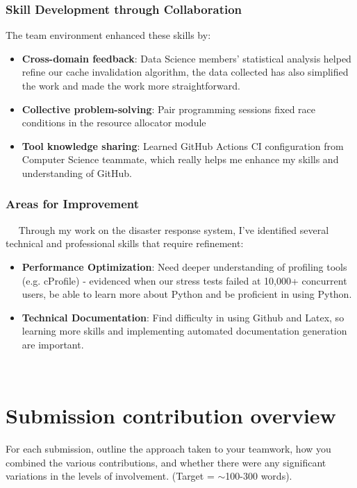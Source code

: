 \documentclass[a4paper, 11pt]{report}
\begin{document}
\subsubsection{Skill Development through Collaboration}
The team environment enhanced these skills by:
\begin{itemize}
    \item \textbf{Cross-domain feedback}: Data Science members' statistical analysis helped refine our cache invalidation algorithm, the data collected has also simplified the work and made the work more straightforward.
    \item \textbf{Collective problem-solving}: Pair programming sessions fixed race conditions in the resource allocator module
    \item \textbf{Tool knowledge sharing}: Learned GitHub Actions CI configuration from Computer Science teammate, which really helps me enhance my skills and understanding of GitHub.
\end{itemize}

\subsubsection{Areas for Improvement}  
Through my work on the disaster response system, I've identified several technical and professional skills that require refinement:
\begin{itemize}
    \item \textbf{Performance Optimization}: Need deeper understanding of profiling tools (e.g. cProfile) - evidenced when our stress tests failed at 10,000+ concurrent users, be able to learn more about Python and be proficient in using Python. 
    \item \textbf{Technical Documentation}: Find difficulty in using Github and Latex, so learning more skills and implementing automated documentation generation are important.
\end{itemize}   





\newpage

\section{Submission contribution overview}

For each submission, outline the approach taken to your teamwork, how you combined the various contributions, and whether there were any significant variations in the levels of involvement. (Target = $\sim$100-300 words).
\end{document}

